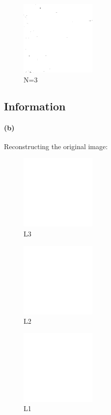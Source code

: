 \documentclass{article}
\newcommand{\info}{\clearpage \subsection*{Information}}
\newcommand{\spart}[1]{\paragraph{(#1)}}
\begin{document}
\begin{figure}[!h]
  \centering
  \includegraphics[height=10em]{code/outputs/prob6a_3.png}
  \caption{N=3}
\end{figure}
\info

\spart{b} Reconstructing the original image:

\begin{figure}[!h]
  \centering
  \includegraphics[height=10em]{code/outputs/prob6b_2.png}
  \caption{L3}
\end{figure}

\begin{figure}[!h]
  \centering
  \includegraphics[height=10em]{code/outputs/prob6b_1.png}
  \caption{L2}
\end{figure}

\begin{figure}[!h]
  \centering
  \includegraphics[height=10em]{code/outputs/prob6b_0.png}
  \caption{L1}
\end{figure}
\end{document}
